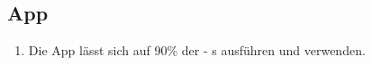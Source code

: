 \subsection{App}

\begin{enumerate}
    \item Die App lässt sich auf 90\% der %
    -%
    s ausführen und verwenden.
\end{enumerate}